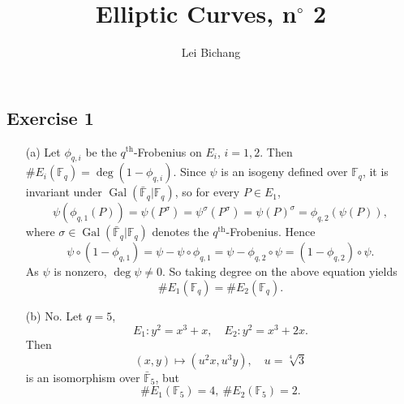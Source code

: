 \documentclass{article}
\title{Elliptic Curves, n$^\circ$ 2}
\author{Lei Bichang}
\theoremstyle{definition}
\theoremstyle{remark}
\newcommand{\F}{\mathbb{F}}
\DeclareMathOperator{\gal}{Gal}
\begin{document}
\maketitle


\subsection*{Exercise 1}

\begin{enumerate}
    \item [(a)] Let $\phi_{q, i}$ be the $q^{\mathrm{th}}$-Frobenius on $E_i$, $i = 1, 2$.
    Then $\# E_i(\F_q) = \deg (1 - \phi_{q, i})$.
    Since $\psi$ is an isogeny defined over $\F_q$, it is invariant under $\gal(\bar{ \F}_q|\F_q)$,
    so for every $P\in E_1$,\[\psi(\phi_{q,1}(P)) = \psi(P^{\sigma}) = \psi^\sigma(P^\sigma) = \psi(P)^\sigma = \phi_{q, 2}(\psi(P)),\]
    where $\sigma \in \gal(\bar{ \F}_q|\F_q)$ denotes the $q^{\mathrm{th}}$-Frobenius.
    Hence \[\psi\circ (1 - \phi_{q, 1}) = \psi - \psi\circ\phi_{q, 1} = \psi - \phi_{q, 2}\circ\psi = (1 - \phi_{q, 2})\circ\psi.\]
    As $\psi$ is nonzero, $\deg\psi\ne 0$.
    So taking degree on the above equation yields\[\# E_1(\F_q) = \# E_2(\F_q).\]
    
    \item [(b)]
    No. Let $q = 5$, \[E_1 : y^2 = x^3 + x,\quad E_2  : y^2 = x^3 + 2x.\]
    Then \[(x, y)\mapsto (u^2x, u^3y),\quad u = \sqrt[4]{3}\]
    is an isomorphism over $\bar{\F}_5$,
    but \[\# E_1(\F_5) = 4,\ \# E_2(\F_5) = 2.\]



\end{enumerate}
\end{document}
